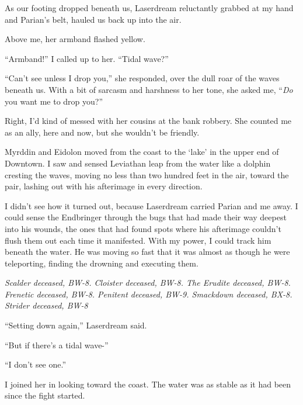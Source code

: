 As our footing dropped beneath us, Laserdream reluctantly grabbed at my hand and Parian's belt, hauled us back up into the air.



Above me, her armband flashed yellow.



``Armband!'' I called up to her. ``Tidal wave?''



``Can't see unless I drop you,'' she responded, over the dull roar of the waves beneath us.  With a bit of sarcasm and harshness to her tone, she asked me, ``\emph{Do} you want me to drop you?''



Right, I'd kind of messed with her cousins at the bank robbery.  She counted me as an ally, here and now, but she wouldn't be friendly.



Myrddin and Eidolon moved from the coast to the `lake' in the upper end of Downtown.  I saw and sensed Leviathan leap from the water like a dolphin cresting the waves, moving no less than two hundred feet in the air, toward the pair, lashing out with his afterimage in every direction.



I didn't see how it turned out, because Laserdream carried Parian and me away.  I could sense the Endbringer through the bugs that had made their way deepest into his wounds, the ones that had found spots where his afterimage couldn't flush them out each time it manifested.  With my power, I could track him beneath the water.  He was moving so fast that it was almost as though he were teleporting, finding the drowning and executing them.



\emph{Scalder deceased, BW-8.  Cloister deceased, BW-8.  The Erudite deceased, BW-8.  Frenetic deceased, BW-8.  Penitent deceased, BW-9.  Smackdown deceased, BX-8.  Strider deceased, BW-8}



``Setting down again,'' Laserdream said.



``But if there's a tidal wave-''



``I don't see one.''



I joined her in looking toward the coast.  The water was as stable as it had been since the fight started.



